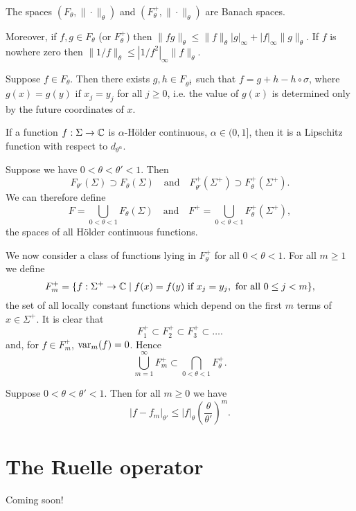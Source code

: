 \begin{proposition}
	The spaces $(F_\theta, \|\cdot\|_\theta)$ and $(F_\theta^+, \|\cdot\|_\theta)$ are Banach spaces.
	
	Moreover, if $f, g \in F_\theta$ (or $F_\theta^+$) then $\|fg\|_\theta \leq \|f\|_\theta |g|_\infty + |f|_\infty \|g\|_\theta$. If $f$ is nowhere zero then $\|1 / f\|_\theta \leq |1 / f^2|_\infty \|f\|_\theta$.
\end{proposition}

\begin{proposition}
	Suppose $f \in F_\theta$. Then there exists $g, h \in F_{\theta^{\frac{1}{2}}}$ such that $f = g + h - h \circ \sigma$, where $g(x) = g(y)$ if $x_j = y_j$ for all $j \geq 0$, i.e. the value of $g(x)$ is determined only by the future coordinates of $x$.
\end{proposition}

If a function $f : \Sigma \to \mathbb{C}$ is $\alpha$-H\"older continuous, $\alpha \in (0, 1]$, then it is a Lipschitz function with respect to $d_{\theta^\alpha}$.

Suppose we have $0 < \theta < \theta' < 1$. Then
\[
	F_{\theta'}(\Sigma) \supset F_\theta(\Sigma) \quad \text{and} \quad F_{\theta'}^+(\Sigma^+) \supset F_\theta^+(\Sigma^+).
\]
We can therefore define
\[
	F = \bigcup_{0 < \theta < 1}{F_\theta(\Sigma)} \quad \text{and} \quad F^+ = \bigcup_{0 < \theta < 1}{F_\theta^+(\Sigma^+)},
\]
the spaces of all H\"older continuous functions.

We now consider a class of functions lying in $F_\theta^+$ for all $0 < \theta < 1$. For all $m \geq 1$ we define
\[
	F_m^+ = \{f : \Sigma^+ \to \mathbb{C} \mid f(x) = f(y) \text{ if } x_j = y_j, \text{ for all } 0 \leq j < m\},
\]
the set of all locally constant functions which depend on the first $m$ terms of $x \in \Sigma^+$. It is clear that
\[
	F_1^+ \subset F_2^+ \subset F_3^+ \subset \dots.
\]
and, for $f \in F_m^+$, $\operatorname{var}_m(f) = 0$. Hence
\[
	\bigcup_{m = 1}^\infty{F_m^+} \subset \bigcap_{0 < \theta < 1}{F_\theta^+}.
\]

\begin{proposition}
	Suppose $0 < \theta < \theta' < 1$. Then for all $m \geq 0$ we have
	\begin{equation*}
		|f - f_m|_{\theta'} \leq |f|_\theta \left(\frac{\theta}{\theta'}\right)^m.
	\end{equation*}
\end{proposition}

\section{The Ruelle operator}
\begin{theorem}
	Coming soon!
\end{theorem}
